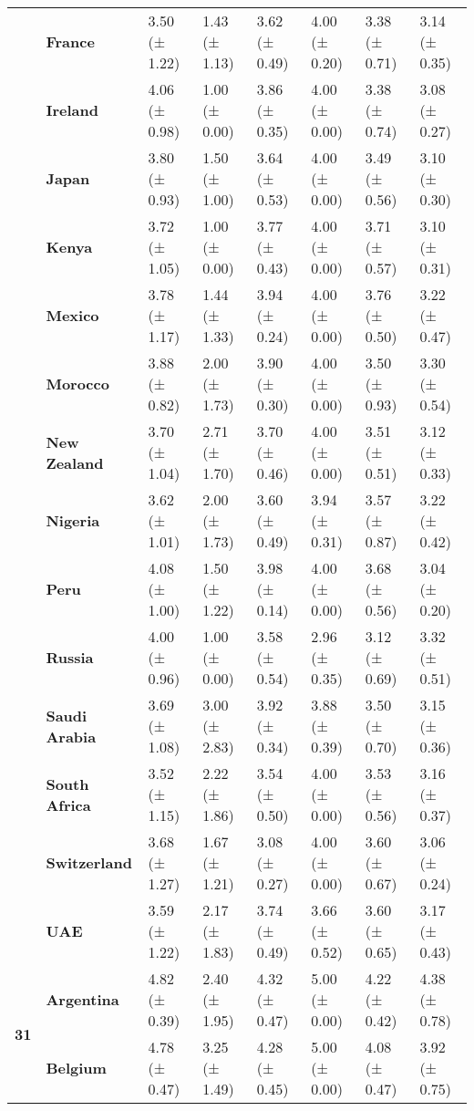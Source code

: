 \begin{longtable}{llllllll}
\textbf{} & \textbf{France} & 3.50 (± 1.22) & 1.43 (± 1.13) & 3.62 (± 0.49) & 4.00 (± 0.20) & 3.38 (± 0.71) & 3.14 (± 0.35) \\
\textbf{} & \textbf{Ireland} & 4.06 (± 0.98) & 1.00 (± 0.00) & 3.86 (± 0.35) & 4.00 (± 0.00) & 3.38 (± 0.74) & 3.08 (± 0.27) \\
\textbf{} & \textbf{Japan} & 3.80 (± 0.93) & 1.50 (± 1.00) & 3.64 (± 0.53) & 4.00 (± 0.00) & 3.49 (± 0.56) & 3.10 (± 0.30) \\
\textbf{} & \textbf{Kenya} & 3.72 (± 1.05) & 1.00 (± 0.00) & 3.77 (± 0.43) & 4.00 (± 0.00) & 3.71 (± 0.57) & 3.10 (± 0.31) \\
\textbf{} & \textbf{Mexico} & 3.78 (± 1.17) & 1.44 (± 1.33) & 3.94 (± 0.24) & 4.00 (± 0.00) & 3.76 (± 0.50) & 3.22 (± 0.47) \\
\textbf{} & \textbf{Morocco} & 3.88 (± 0.82) & 2.00 (± 1.73) & 3.90 (± 0.30) & 4.00 (± 0.00) & 3.50 (± 0.93) & 3.30 (± 0.54) \\
\textbf{} & \textbf{New Zealand} & 3.70 (± 1.04) & 2.71 (± 1.70) & 3.70 (± 0.46) & 4.00 (± 0.00) & 3.51 (± 0.51) & 3.12 (± 0.33) \\
\textbf{} & \textbf{Nigeria} & 3.62 (± 1.01) & 2.00 (± 1.73) & 3.60 (± 0.49) & 3.94 (± 0.31) & 3.57 (± 0.87) & 3.22 (± 0.42) \\
\textbf{} & \textbf{Peru} & 4.08 (± 1.00) & 1.50 (± 1.22) & 3.98 (± 0.14) & 4.00 (± 0.00) & 3.68 (± 0.56) & 3.04 (± 0.20) \\
\textbf{} & \textbf{Russia} & 4.00 (± 0.96) & 1.00 (± 0.00) & 3.58 (± 0.54) & 2.96 (± 0.35) & 3.12 (± 0.69) & 3.32 (± 0.51) \\
\textbf{} & \textbf{Saudi Arabia} & 3.69 (± 1.08) & 3.00 (± 2.83) & 3.92 (± 0.34) & 3.88 (± 0.39) & 3.50 (± 0.70) & 3.15 (± 0.36) \\
\textbf{} & \textbf{South Africa} & 3.52 (± 1.15) & 2.22 (± 1.86) & 3.54 (± 0.50) & 4.00 (± 0.00) & 3.53 (± 0.56) & 3.16 (± 0.37) \\
\textbf{} & \textbf{Switzerland} & 3.68 (± 1.27) & 1.67 (± 1.21) & 3.08 (± 0.27) & 4.00 (± 0.00) & 3.60 (± 0.67) & 3.06 (± 0.24) \\
\textbf{} & \textbf{UAE} & 3.59 (± 1.22) & 2.17 (± 1.83) & 3.74 (± 0.49) & 3.66 (± 0.52) & 3.60 (± 0.65) & 3.17 (± 0.43) \\
\cline{1-8}
\multirow[t]{19}{*}{\textbf{31}} & \textbf{Argentina} & 4.82 (± 0.39) & 2.40 (± 1.95) & 4.32 (± 0.47) & 5.00 (± 0.00) & 4.22 (± 0.42) & 4.38 (± 0.78) \\
\textbf{} & \textbf{Belgium} & 4.78 (± 0.47) & 3.25 (± 1.49) & 4.28 (± 0.45) & 5.00 (± 0.00) & 4.08 (± 0.47) & 3.92 (± 0.75) \\

\end{longtable}
